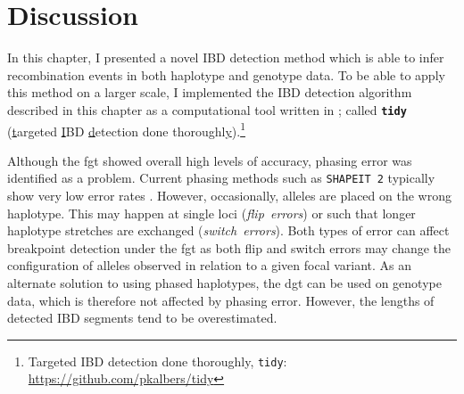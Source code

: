%
%
%



%
\section{Discussion}
%


In this chapter, I presented a novel IBD detection method which is able to infer recombination events in both haplotype and genotype data.
To be able to apply this method on a larger scale, I implemented the IBD detection algorithm described in this chapter as a computational tool written in \cpp; called \textbf{\texttt{tidy}} (\underline{t}argeted \underline{I}BD \underline{d}etection done thoroughl\underline{y}).\footnote{Targeted IBD detection done thoroughly, \texttt{tidy}: \url{https://github.com/pkalbers/tidy}}

Although the \gls{fgt} showed overall high levels of accuracy, phasing error was identified as a problem.
Current phasing methods such as \texttt{SHAPEIT\,2} typically show very low error rates \citep{OConnell:2014fl}.
However, occasionally, alleles are placed on the wrong haplotype.
This may happen at single loci (\emph{flip~errors}) or such that longer haplotype stretches are exchanged (\emph{switch~errors}).
Both types of error can affect breakpoint detection under the \gls{fgt} as both flip and switch errors may change the configuration of alleles observed in relation to a given focal variant.
As an alternate solution to using phased haplotypes, the \gls{dgt} can be used on genotype data, which is therefore not affected by phasing error.
However, the lengths of detected IBD segments tend to be overestimated.

